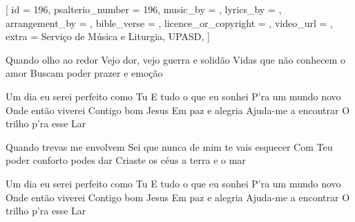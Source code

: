 [
    id                     = {196},
    psalterio_number       = {196},
    music_by               = {},
    lyrics_by              = {},
    arrangement_by         = {},
    bible_verse            = {},
    licence_or_copyright   = {},
    video_url              = {},
    extra                  = {Serviço de Música e Liturgia, UPASD},
]


\beginverse
Quando olho ao redor
Vejo dor, vejo guerra e solidão
Vidas que não conhecem o amor
Buscam poder prazer e emoção
\endverse


\beginchorus
Um dia eu serei perfeito como Tu
E tudo o que eu sonhei
P'ra um mundo novo
Onde então viverei
Contigo bom Jesus
Em paz e alegria
Ajuda-me a encontrar
O trilho p'ra esse Lar
\endchorus


\beginverse
Quando trevas me envolvem
Sei que nunca de mim te vais esquecer
Com Teu poder conforto podes dar
Criaste os céus a terra e o mar
\endverse


\beginchorus
Um dia eu serei perfeito como Tu
E tudo o que eu sonhei
P'ra um mundo novo
Onde então viverei
Contigo bom Jesus
Em paz e alegria
Ajuda-me a encontrar
O trilho p'ra esse Lar
\endchorus


\endsong
